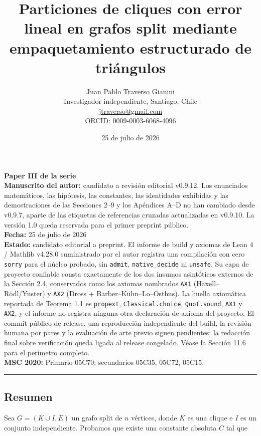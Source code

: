 \documentclass[
  11pt,
]{article}
\title{Particiones de cliques con error lineal en grafos split mediante empaquetamiento estructurado de triángulos}
\author{Juan Pablo Traverso Gianini\\
\small Investigador independiente, Santiago, Chile\\
\small \href{mailto:jtraverso@gmail.com}{jtraverso@gmail.com}\\
\small ORCID: 0009-0003-6068-4096}
\date{25 de julio de 2026}
\begin{document}
\renewcommand{\figurename}{Figura}
\sloppy
\raggedbottom
\maketitle
\begin{small}\begin{raggedright}
\textbf{Paper III de la serie}\\
\textbf{Manuscrito del autor:} candidato a revisión editorial v0.9.12. Los enunciados matemáticos, las hipótesis, las constantes, las identidades exhibidas y las demostraciones de las Secciones 2--9 y los Apéndices A--D no han cambiado desde v0.9.7, aparte de las etiquetas de referencias cruzadas actualizadas en v0.9.10. La versión 1.0 queda reservada para el primer preprint público.\\
\textbf{Fecha:} 25 de julio de 2026\\
\textbf{Estado:} candidato editorial a preprint. El informe de build y axiomas de Lean 4 / Mathlib v4.28.0 suministrado por el autor registra una compilación con cero \texttt{sorry} para el núcleo probado, sin \texttt{admit}, \texttt{native\_decide} ni \texttt{unsafe}. Su capa de proyecto confiable consta exactamente de los dos insumos asintóticos externos de la Sección 2.4, conservados como los axiomas nombrados \texttt{AX1} (Haxell--Rödl/Yuster) y \texttt{AX2} (Dross + Barber--Kühn--Lo--Osthus). La huella axiomática reportada de Teorema 1.1 es \texttt{propext}, \texttt{Classical.choice}, \texttt{Quot.sound}, \texttt{AX1} y \texttt{AX2}, y el informe no registra ninguna otra declaración de axioma del proyecto. El commit público de release, una reproducción independiente del build, la revisión humana por pares y la evaluación de arte previo siguen pendientes; la redacción final sobre verificación queda ligada al release congelado. Véase la Sección 11.6 para el perímetro completo.\\
\textbf{MSC 2020:} Primario 05C70; secundarios 05C35, 05C72, 05C15.
\begin{center}\rule{0.5\linewidth}{0.5pt}\end{center}
\end{raggedright}\end{small}

\subsection{Resumen}\label{resumen}

Sea \(G=(K\cup I,E)\) un grafo split de \(n\) vértices, donde \(K\) es una clique e \(I\) es un conjunto independiente. Probamos que existe una constante absoluta \(C\) tal que
\end{document}
